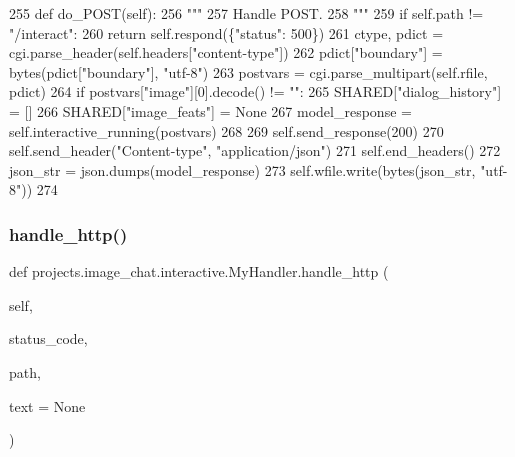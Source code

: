 \begin{DoxyCode}
255     \textcolor{keyword}{def }do\_POST(self):
256         \textcolor{stringliteral}{"""}
257 \textcolor{stringliteral}{        Handle POST.}
258 \textcolor{stringliteral}{        """}
259         \textcolor{keywordflow}{if} self.path != \textcolor{stringliteral}{"/interact"}:
260             \textcolor{keywordflow}{return} self.respond(\{\textcolor{stringliteral}{"status"}: 500\})
261         ctype, pdict = cgi.parse\_header(self.headers[\textcolor{stringliteral}{"content-type"}])
262         pdict[\textcolor{stringliteral}{"boundary"}] = bytes(pdict[\textcolor{stringliteral}{"boundary"}], \textcolor{stringliteral}{"utf-8"})
263         postvars = cgi.parse\_multipart(self.rfile, pdict)
264         \textcolor{keywordflow}{if} postvars[\textcolor{stringliteral}{"image"}][0].decode() != \textcolor{stringliteral}{""}:
265             SHARED[\textcolor{stringliteral}{"dialog\_history"}] = []
266             SHARED[\textcolor{stringliteral}{"image\_feats"}] = \textcolor{keywordtype}{None}
267         model\_response = self.interactive\_running(postvars)
268 
269         self.send\_response(200)
270         self.send\_header(\textcolor{stringliteral}{"Content-type"}, \textcolor{stringliteral}{"application/json"})
271         self.end\_headers()
272         json\_str = json.dumps(model\_response)
273         self.wfile.write(bytes(json\_str, \textcolor{stringliteral}{"utf-8"}))
274 
\end{DoxyCode}
\mbox{\label{classprojects_1_1image__chat_1_1interactive_1_1MyHandler_af277e2d0f6c00fc1d0d3467c577a20f8}} 
\subsubsection{\texorpdfstring{handle\+\_\+http()}{handle\_http()}}
{\footnotesize\ttfamily def projects.\+image\+\_\+chat.\+interactive.\+My\+Handler.\+handle\+\_\+http (\begin{DoxyParamCaption}\item[{}]{self,  }\item[{}]{status\+\_\+code,  }\item[{}]{path,  }\item[{}]{text = {\ttfamily None} }\end{DoxyParamCaption})}

